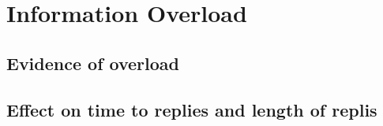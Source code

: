 \section{Information Overload}\label{section:overload}

\subsection{Evidence of overload}


\subsection{Effect on time to replies and length of replis}